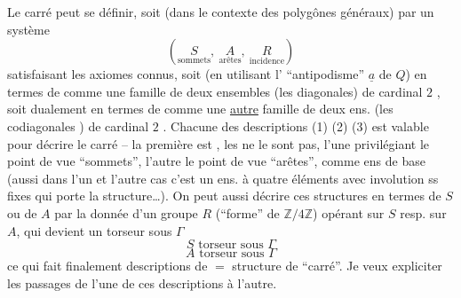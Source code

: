 Le carré peut se définir, soit (dans le contexte des polygônes généraux) par un système
\[
(\underset{\text{sommets}}{S},\ \underset{\text{arêtes}}{A},\ \underset{\text{incidence}}{R})\tag*{(1)}
\]
satisfaisant les axiomes connus, soit (en utilisant l' ``antipodisme'' $\underline{a}$ de $Q$) en termes de
 comme une famille de deux ensembles (les diagonales) de cardinal $2$ , soit dualement  en termes de
comme une \uline{autre} famille de deux ens. (les codiagonales ) de cardinal $2$ . Chacune des descriptions (1) (2) (3) est valable pour décrire le carré -- la première est  , les   ne le sont pas, l'une privilégiant le point de vue ``sommets'', l'autre le point de vue ``arêtes'', comme ens de base (aussi dans l'un et l'autre cas c'est un ens. à quatre éléments avec involution ss 
fixes qui porte la structure\ldots). On peut aussi décrire ces structures en termes de $S$ ou de $A$ par la donnée d'un groupe $R$ (``forme'' de $\mathbb{Z}/4\mathbb{Z}$) opérant sur $S$ resp. sur $A$, qui devient un torseur sous $\Gamma$
\[
 S\text{ torseur sous }\Gamma\tag*{(2 bis)}
\]
\[
 A\text{ torseur sous }\Gamma\tag*{(3 bis)}
\]
ce qui fait finalement   descriptions de  $=$ structure de ``carré''. Je veux expliciter les passages de l'une de ces descriptions à l'autre.

